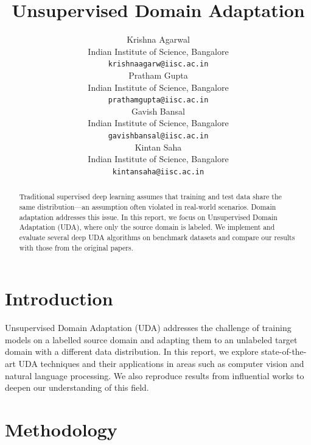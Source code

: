 \documentclass{article}
\title{Unsupervised Domain Adaptation}
\author{ Krishna Agarwal\\%
  Indian Institute of Science, Bangalore\\
  \texttt{krishnaagarw@iisc.ac.in} \\
   \And
  {Pratham Gupta} \\
  Indian Institute of Science, Bangalore\\
  \texttt{prathamgupta@iisc.ac.in} \\
   \And
   {Gavish Bansal} \\
   Indian Institute of Science, Bangalore\\
   \texttt{gavishbansal@iisc.ac.in} \\
   \And
   {Kintan Saha} \\
   Indian Institute of Science, Bangalore\\
   \texttt{kintansaha@iisc.ac.in} \\
}
\begin{document}
\graphicspath{{./images/}}

\maketitle


\begin{abstract}
  Traditional supervised deep learning assumes that training and test data share the same distribution—an assumption often violated in real-world scenarios. Domain adaptation addresses this issue. In this report, we focus on Unsupervised Domain Adaptation (UDA), where only the source domain is labeled. We implement and evaluate several deep UDA algorithms on benchmark datasets and compare our results with those from the original papers.
\end{abstract}


\section{Introduction}
Unsupervised Domain Adaptation (UDA) addresses the challenge of training models on a labelled source domain and adapting them to an unlabeled target domain with a different data distribution. In this report, we explore state-of-the-art UDA techniques and their applications in areas such as computer vision and natural language processing. We also reproduce results from influential works \cite{ganin2016domainadversarialtrainingneuralnetworks,survey,Ben-David2010} to deepen our understanding of this field.

\section{Methodology}
\end{document}
